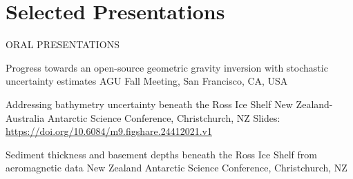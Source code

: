 \documentclass{ExpressiveResume}
\begin{document}
\section{Selected Presentations}
\noindent ORAL PRESENTATIONS \newline
\begin{cventries}
    {Progress towards an open-source geometric gravity inversion with stochastic uncertainty estimates}
    {AGU Fall Meeting, San Francisco, CA, USA}
    {}
    {}
    {}

    \talk{}
    {Addressing bathymetry uncertainty beneath the Ross Ice Shelf}
    {New Zealand-Australia Antarctic Science Conference, Christchurch, NZ}
    {Slides: \url{https://doi.org/10.6084/m9.figshare.24412021.v1}}
    {}
    {}

    {Sediment thickness and basement depths beneath the Ross Ice Shelf from aeromagnetic data}
    {New Zealand Antarctic Science Conference, Christchurch, NZ}
    {}
    {}

\end{cventries}
\end{document}

